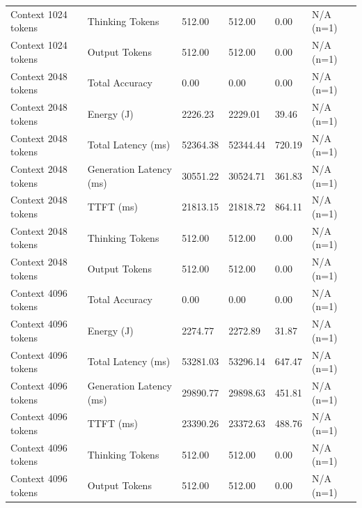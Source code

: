 \begin{table}
\begin{tabular}{llllll}
Context 1024 tokens & Thinking Tokens & 512.00 & 512.00 & 0.00 & N/A (n=1) \\
Context 1024 tokens & Output Tokens & 512.00 & 512.00 & 0.00 & N/A (n=1) \\
Context 2048 tokens & Total Accuracy & 0.00 & 0.00 & 0.00 & N/A (n=1) \\
Context 2048 tokens & Energy (J) & 2226.23 & 2229.01 & 39.46 & N/A (n=1) \\
Context 2048 tokens & Total Latency (ms) & 52364.38 & 52344.44 & 720.19 & N/A (n=1) \\
Context 2048 tokens & Generation Latency (ms) & 30551.22 & 30524.71 & 361.83 & N/A (n=1) \\
Context 2048 tokens & TTFT (ms) & 21813.15 & 21818.72 & 864.11 & N/A (n=1) \\
Context 2048 tokens & Thinking Tokens & 512.00 & 512.00 & 0.00 & N/A (n=1) \\
Context 2048 tokens & Output Tokens & 512.00 & 512.00 & 0.00 & N/A (n=1) \\
Context 4096 tokens & Total Accuracy & 0.00 & 0.00 & 0.00 & N/A (n=1) \\
Context 4096 tokens & Energy (J) & 2274.77 & 2272.89 & 31.87 & N/A (n=1) \\
Context 4096 tokens & Total Latency (ms) & 53281.03 & 53296.14 & 647.47 & N/A (n=1) \\
Context 4096 tokens & Generation Latency (ms) & 29890.77 & 29898.63 & 451.81 & N/A (n=1) \\
Context 4096 tokens & TTFT (ms) & 23390.26 & 23372.63 & 488.76 & N/A (n=1) \\
Context 4096 tokens & Thinking Tokens & 512.00 & 512.00 & 0.00 & N/A (n=1) \\
Context 4096 tokens & Output Tokens & 512.00 & 512.00 & 0.00 & N/A (n=1) \\
\bottomrule
\end{tabular}
\end{table}
